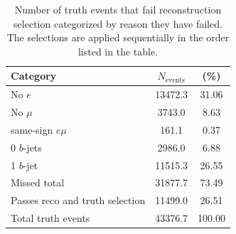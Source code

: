 \begin{table}
\begin{center}
\begin{tabular}{|l|cc|}
\hline
Category & $N_{\textrm{events}}$ & (\%) \\
\hline
No $e$ & 13472.3 &	31.06 \\
No $\mu$ & 3743.0 & 8.63 \\
same-sign $e\mu$ & 161.1 & 0.37 \\
0 $b$-jets & 2986.0	& 6.88 \\
1 $b$-jet  & 11515.3 & 26.55 \\
\hline
Missed total & 31877.7 & 73.49 \\
\hline \hline
Passes reco and truth selection & 11499.0 & 26.51 \\
\hline
Total truth events & 43376.7 & 100.00 \\
\hline

\end{tabular}
\caption{Number of truth events that fail reconstruction selection categorized by reason they have failed. The selections are applied sequentially in the order listed in the table.}
\label{t:truthnotreco}
\end{center}
\end{table}

